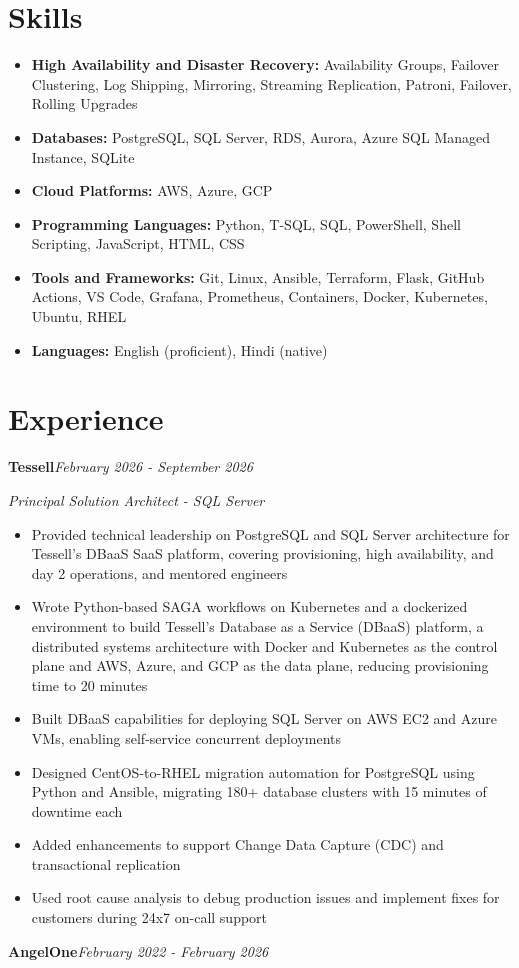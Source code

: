 \documentclass[10pt,a4paper]{article}
\begin{document}
\section{Skills}
\begin{itemize}
  \item \textbf{High Availability and Disaster Recovery:} Availability Groups, Failover Clustering, Log Shipping, Mirroring, Streaming Replication, Patroni, Failover, Rolling Upgrades
  \item \textbf{Databases:} PostgreSQL, SQL Server, RDS, Aurora, Azure SQL Managed Instance, SQLite
  \item \textbf{Cloud Platforms:} AWS, Azure, GCP
  \item \textbf{Programming Languages:} Python, T-SQL, SQL, PowerShell, Shell Scripting, JavaScript, HTML, CSS
  \item \textbf{Tools and Frameworks:} Git, Linux, Ansible, Terraform, Flask, GitHub Actions, VS Code, Grafana, Prometheus, Containers, Docker, Kubernetes, Ubuntu, RHEL
  \item \textbf{Languages:} English (proficient), Hindi (native)
\end{itemize}

\section{Experience}

\noindent\textbf{Tessell}\hfill \textit{February 2026 - September 2026}

\textit{Principal Solution Architect - SQL Server}\\[-5pt]
\begin{itemize}
  \item Provided technical leadership on PostgreSQL and SQL Server architecture for Tessell's DBaaS SaaS platform, covering provisioning, high availability, and day 2 operations, and mentored engineers
  \item Wrote Python-based SAGA workflows on Kubernetes and a dockerized environment to build Tessell's Database as a Service (DBaaS) platform, a distributed systems architecture with Docker and Kubernetes as the control plane and AWS, Azure, and GCP as the data plane, reducing provisioning time to 20 minutes
  \item Built DBaaS capabilities for deploying SQL Server on AWS EC2 and Azure VMs, enabling self-service concurrent deployments
  \item Designed CentOS-to-RHEL migration automation for PostgreSQL using Python and Ansible, migrating 180+ database clusters with 15 minutes of downtime each
  \item Added enhancements to support Change Data Capture (CDC) and transactional replication
  \item Used root cause analysis to debug production issues and implement fixes for customers during 24x7 on-call support
\end{itemize}
\vspace{14.7pt}
\noindent\textbf{AngelOne}\hfill \textit{February 2022 - February 2026}
\end{document}
